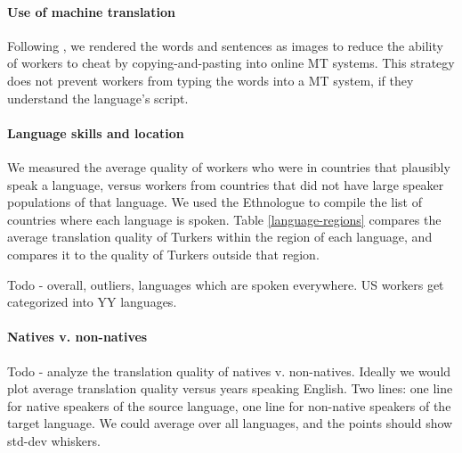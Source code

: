 \documentclass[11pt]{article}
\begin{document}
\paragraph{Use of machine translation}
Following , we rendered the words and sentences as images to reduce the ability of workers to cheat by copying-and-pasting into online MT systems.  This strategy does not prevent workers from typing the words into a MT system, if they understand the language's script.
%




\paragraph{Language skills and location}

We measured the average quality of workers who were in countries that plausibly speak a language, versus workers from countries that did not have large speaker populations of that language.  We used the Ethnologue \cite{ethnologue} to compile the list of countries where each language is spoken.  Table \ref{language-regions} compares the average translation quality of Turkers within the region of each language, and compares it to the quality of Turkers outside that region.  

Todo - overall, outliers, languages which are spoken everywhere. US workers get categorized into YY languages. 


\paragraph{Natives v. non-natives}
Todo - analyze the translation quality of natives v. non-natives.  Ideally we would plot average translation quality versus years speaking English.  Two lines: one line for native speakers of the source language, one line for non-native speakers of the target language.  We could average over all languages, and the points should show std-dev whiskers.
\end{document}
